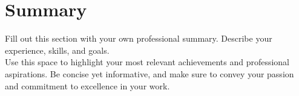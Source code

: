 \section{Summary}
Fill out this section with your own professional summary. Describe your experience, skills, and goals. \\ 

\noindent Use this space to highlight your most relevant achievements and professional aspirations. Be concise yet informative, and make sure to convey your passion and commitment to excellence in your work.
